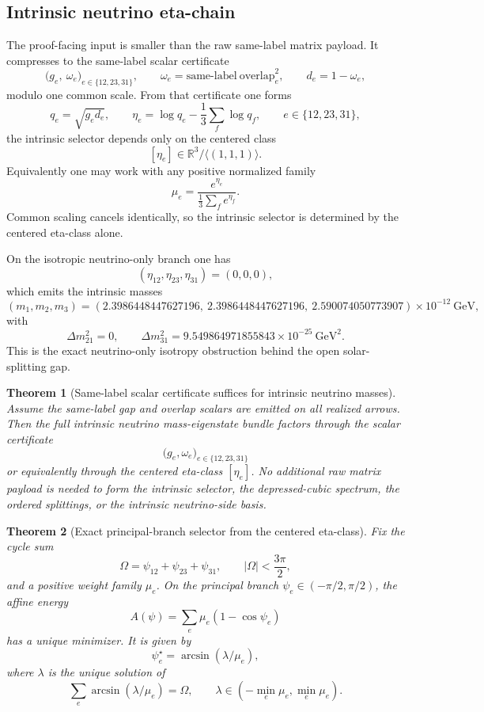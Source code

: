 \documentclass[11pt]{article}
\newtheorem{theorem}{Theorem}[section]
\begin{document}
\subsection{Intrinsic neutrino eta-chain}

The proof-facing input is smaller than the raw same-label matrix payload. It compresses to the
same-label scalar certificate
\[
\bigl(g_e,\ \omega_e\bigr)_{e\in\{12,23,31\}},
\qquad
\omega_e=\mathrm{same\text{-}label\ overlap}_e^2,
\qquad
d_e=1-\omega_e,
\]
modulo one common scale. From that certificate one forms
\[
q_e=\sqrt{g_e d_e},
\qquad
\eta_e=\log q_e-\frac13\sum_f \log q_f,
\qquad
e\in\{12,23,31\},
\]
the intrinsic selector depends only on the centered class
\[
[\eta_e]\in \mathbb{R}^3/\langle(1,1,1)\rangle.
\]
Equivalently one may work with any positive normalized family
\[
\mu_e=\frac{e^{\eta_e}}{\frac13\sum_f e^{\eta_f}}.
\]
Common scaling cancels identically, so the intrinsic selector is determined by the centered
eta-class alone.

On the isotropic neutrino-only branch one has
\[
(\eta_{12},\eta_{23},\eta_{31})=(0,0,0),
\]
which emits the intrinsic masses
\[
(m_1,m_2,m_3)=
(2.3986448447627196,\ 2.3986448447627196,\ 2.590074050773907)\times10^{-12}\ \mathrm{GeV},
\]
with
\[
\Delta m_{21}^2=0,
\qquad
\Delta m_{31}^2=9.549864971855843\times10^{-25}\ \mathrm{GeV}^2.
\]
This is the exact neutrino-only isotropy obstruction behind the open solar-splitting gap.

\begin{theorem}[Same-label scalar certificate suffices for intrinsic neutrino masses]
Assume the same-label gap and overlap scalars are emitted on all realized arrows. Then the full
intrinsic neutrino mass-eigenstate bundle factors through the scalar certificate
\[
\bigl(g_e,\omega_e\bigr)_{e\in\{12,23,31\}}
\]
or equivalently through the centered eta-class \([\eta_e]\). No additional raw matrix payload is
needed to form the intrinsic selector, the depressed-cubic spectrum, the ordered splittings, or
the intrinsic neutrino-side basis.
\end{theorem}

\begin{theorem}[Exact principal-branch selector from the centered eta-class]
Fix the cycle sum
\[
\Omega=\psi_{12}+\psi_{23}+\psi_{31},
\qquad |\Omega|<\frac{3\pi}{2},
\]
and a positive weight family \(\mu_e\). On the principal branch
\(\psi_e\in(-\pi/2,\pi/2)\), the affine energy
\[
A(\psi)=\sum_e \mu_e(1-\cos\psi_e)
\]
has a unique minimizer. It is given by
\[
\psi_e^\star=\arcsin(\lambda/\mu_e),
\]
where \(\lambda\) is the unique solution of
\[
\sum_e \arcsin(\lambda/\mu_e)=\Omega,
\qquad
\lambda\in(-\min_e\mu_e,\min_e\mu_e).
\]
\end{theorem}
\end{document}
